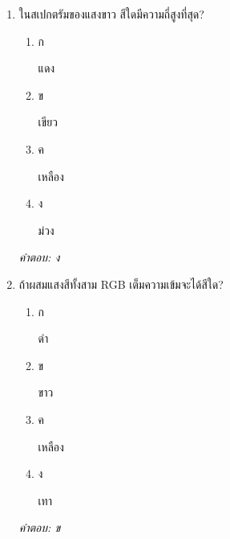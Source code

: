 \documentclass[12pt]{article}
\begin{document}
\begin{enumerate}[label=\arabic*., itemsep=0.5\baselineskip, topsep=0.5\baselineskip, leftmargin=*]
\item ในสเปกตรัมของแสงขาว สีใดมีความถี่สูงที่สุด?
\begin{enumerate}[label=\alph*)., itemsep=0.3\baselineskip, topsep=0.3\baselineskip]
\item ก\ 
\begin{minipage}[t]{0.9\linewidth}
\raggedright แดง
\end{minipage}
\item ข\ 
\begin{minipage}[t]{0.9\linewidth}
\raggedright เขียว
\end{minipage}
\item ค\ 
\begin{minipage}[t]{0.9\linewidth}
\raggedright เหลือง
\end{minipage}
\item ง\ 
\begin{minipage}[t]{0.9\linewidth}
\raggedright ม่วง
\end{minipage}
\end{enumerate}
\vspace{-0.3\baselineskip}
\begin{small}
\textit{คำตอบ: ง}
\end{small}

\item ถ้าผสมแสงสีทั้งสาม RGB เต็มความเข้มจะได้สีใด?
\begin{enumerate}[label=\alph*)., itemsep=0.3\baselineskip, topsep=0.3\baselineskip]
\item ก\ 
\begin{minipage}[t]{0.9\linewidth}
\raggedright ดำ
\end{minipage}
\item ข\ 
\begin{minipage}[t]{0.9\linewidth}
\raggedright ขาว
\end{minipage}
\item ค\ 
\begin{minipage}[t]{0.9\linewidth}
\raggedright เหลือง
\end{minipage}
\item ง\ 
\begin{minipage}[t]{0.9\linewidth}
\raggedright เทา
\end{minipage}
\end{enumerate}
\vspace{-0.3\baselineskip}
\begin{small}
\textit{คำตอบ: ข}
\end{small}


\end{enumerate}
\end{document}

